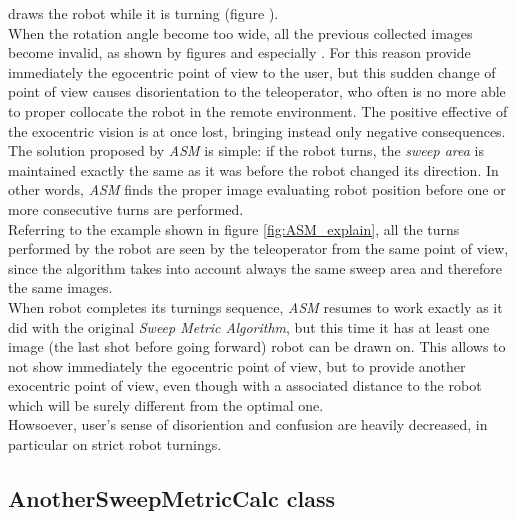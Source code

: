 \framework{} draws the robot while it is turning (figure
).
\\
When the rotation angle become too wide, all the previous collected images
become invalid, as shown by figures  and
especially . For this reason \framework{} provide
immediately the egocentric point of view to the user, but this sudden change
of point of view causes disorientation to the teleoperator, who often is
no more able to proper collocate the robot in the remote environment. The
positive effective of the exocentric vision is at once lost, bringing
instead only negative consequences.
\\
The solution proposed by \textit{ASM} is simple: if the robot turns, the \textit{sweep
area} is maintained exactly the same as it was before the robot changed
its direction. In other words, \textit{ASM} finds the proper image evaluating robot
position before one or more consecutive turns are performed.
\\
Referring to the example shown in figure \ref{fig:ASM_explain}, all the
turns performed by the robot are seen by the teleoperator from the same
point of view, since the algorithm takes into account always the same
sweep area and therefore the same images.
\\
When robot completes its turnings sequence, \textit{ASM} resumes to
work exactly as it did with the original \textit{Sweep Metric Algorithm},
but this time it has at least one image (the last shot before going forward)
robot can be drawn on. This allows \framework{} to not show
immediately the egocentric point of view, but to provide another exocentric
point of view, even though with a associated distance to the robot which
will be surely different from the optimal one.
\\
Howsoever, user's sense of disoriention and confusion are heavily decreased,
in particular on strict robot turnings.

\subsection{AnotherSweepMetricCalc class}
\label{concr:iimageselector:another_sweep_metric_class}

